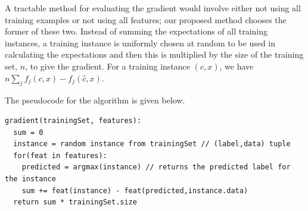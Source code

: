 \documentclass{article} %
\begin{document}
A tractable method for evaluating the gradient would involve either not using all training examples or not using all features; our proposed method chooses the former of these two. Instead of summing the expectations of all training instances, a training instance is uniformly chosen at random to be used in calculating the expectations and then this is multiplied by the size of the training set, $n$, to give the gradient. For a training instance $(c,x)$, we have $n \sum_j f_j (c, x) - f_j (\hat{c}, x)$.

The pseudocode for the algorithm is given below.

\begin{verbatim}
gradient(trainingSet, features):
  sum = 0
  instance = random instance from trainingSet // (label,data) tuple
  for(feat in features):
    predicted = argmax(instance) // returns the predicted label for the instance
    sum += feat(instance) - feat(predicted,instance.data)
  return sum * trainingSet.size
\end{verbatim}
\end{document}
